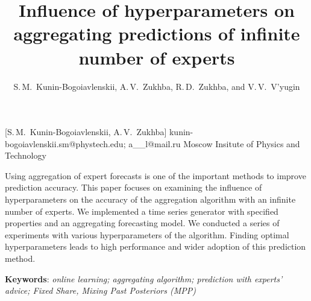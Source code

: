 \documentclass[12pt, twoside]{article}
\begin{document}
\English

\title
	[My first scientific paper] %
    {Influence of hyperparameters on aggregating predictions of infinite number of experts} %
\author
	[S.\,M.~Kunin-Bogoiavlenskii] %
	{S.\,M.~Kunin-Bogoiavlenskii, A.\,V.~Zukhba, R.\,D.~Zukhba, and V.\,V.~V’yugin} %
    [S.\,M.~Kunin-Bogoiavlenskii, A.\,V.~Zukhba] %
\email
    {kunin-bogoiavlenskii.sm@phystech.edu; a\_\_l@mail.ru}
\organization
    {Moscow Insitute of Physics and Technology}
\abstract
    {
    
	Using aggregation of expert forecasts is one of the important methods to improve prediction accuracy. 
	This paper focuses on examining the influence of hyperparameters on the accuracy of the aggregation algorithm with an infinite number of experts.
	We implemented a time series generator with specified properties and an aggregating forecasting model. 
	We conducted a series of experiments with various hyperparameters of the algorithm.
	Finding optimal hyperparameters leads to high performance and wider adoption of this prediction method.
	    	
%	
%	
%	
%				
	\noindent
    	\textbf{Keywords}: \emph{online learning; aggregating algorithm; prediction with experts’ advice; Fixed Share, Mixing Past Posteriors (MPP)}}

\end{document}
